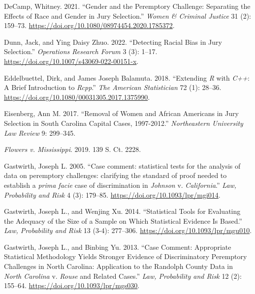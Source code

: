 \documentclass[12pt]{article}
\newlength{\cslhangindent}
\newlength{\cslentryspacingunit} %
\newenvironment{CSLReferences}[2] %
 {%
  \setlength{\parindent}{0pt}
  \ifodd #1
  \let\oldpar\par
  \def\par{\hangindent=\cslhangindent\oldpar}
  \fi
  \setlength{\parskip}{#2\cslentryspacingunit}
 }%
 {}
\begin{document}
\begin{CSLReferences}{1}{0}
\leavevmode{}%
DeCamp, Whitney. 2021. {``Gender and the Peremptory Challenge: Separating the Effects of Race and Gender in Jury Selection.''} \emph{Women \& Criminal Justice} 31 (2): 159--73. \url{https://doi.org/10.1080/08974454.2020.1785372}.

\leavevmode{}%
Dunn, Jack, and Ying Daisy Zhuo. 2022. {``Detecting Racial Bias in Jury Selection.''} \emph{Operations Research Forum} 3 (3): 1--17. \url{https://doi.org/10.1007/s43069-022-00151-x}.

\leavevmode{}%
Eddelbuettel, Dirk, and James Joseph Balamuta. 2018. {``{Extending \emph{R} with \emph{C++}: A Brief Introduction to \emph{Rcpp}}.''} \emph{The American Statistician} 72 (1): 28--36. \url{https://doi.org/10.1080/00031305.2017.1375990}.

\leavevmode{}%
Eisenberg, Ann M. 2017. {``{Removal of Women and African Americans in Jury Selection in South Carolina Capital Cases, 1997-2012}.''} \emph{Northeastern University Law Review} 9: 299--345.

\leavevmode{}%
\emph{Flowers v. Mississippi}. 2019. 139 S. Ct. 2228.

\leavevmode{}%
Gastwirth, Joseph L. 2005. {``{Case comment: statistical tests for the analysis of data on peremptory challenges: clarifying the standard of proof needed to establish a \emph{prima facie} case of discrimination in \emph{Johnson} v. \emph{California}}.''} \emph{Law, Probability and Risk} 4 (3): 179--85. \url{https://doi.org/10.1093/lpr/mgi014}.

\leavevmode{}%
Gastwirth, Joseph L., and Wenjing Xu. 2014. {``Statistical Tools for Evaluating the Adequacy of the Size of a Sample on Which Statistical Evidence Is Based.''} \emph{Law, Probability and Risk} 13 (3-4): 277--306. \url{https://doi.org/10.1093/lpr/mgu010}.

\leavevmode{}%
Gastwirth, Joseph L., and Binbing Yu. 2013. {``Case Comment: Appropriate Statistical Methodology Yields Stronger Evidence of Discriminatory Peremptory Challenges in {North Carolina}: Application to the {Randolph County} Data in \emph{North Carolina} v. \emph{Rouse} and Related Cases.''} \emph{Law, Probability and Risk} 12 (2): 155--64. \url{https://doi.org/10.1093/lpr/mgs030}.


\end{CSLReferences}
\end{document}

